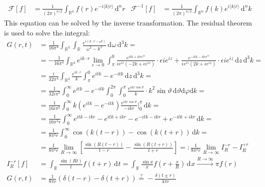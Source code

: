 \documentclass[a4paper,12pt]{article}
\newcommand{\brak}{}
\newcommand{\intx}{}
\newcommand{\intr}{}
\newcommand{\kla}{}
\newcommand{\klam}{}
\newcommand{\tecxt}{}
\begin{document}
\begin{align*}
\mathcal{F}\klam\left[ {f} \right]&=\frac{1}{(2\pi)^{n/2}}\intr\int_{\mathbb{R}^{n}}{f(r)e^{-i\brak\langle {k}| {r}\rangle}}\,\tecxt\text{d}^nr&\mathcal{F}^{-1}\klam\left[ {f} \right]&=\frac{1}{(2\pi)^{n/2}}\intr\int_{\mathbb{R}^{n}}{f(k)e^{i\brak\langle {k}| {r}\rangle}}\,\mathrm{d}^{n}k
\end{align*} 
This equation can be solved by the inverse transformation. The residual theorem is used to solve the integral:
\begin{align*}
G(r,t)&=\frac{1}{16\pi^4}\intr\int_{\mathbb{R}^{3}}{\intr\int_{\mathbb{R}^{ }}{\frac{e^{i\kla\left( {k\cdot r-\omega t} \right)}}{\omega^2-k^2}}\,\mathrm{d}^{ }\omega}\,\mathrm{d}^{3}k= \\
&=-\frac{1}{16\pi^4}\intr\int_{\mathbb{R}^{3}}e^{ik\cdot r}\lim_{\epsilon\rightarrow 0}{\intx\int_{\pi}^{0}\frac{e^{itk+it\epsilon  e^{iz}}}{\epsilon e^{iz}\kla\left( {-2k+\epsilon e^{iz}} \right)}\cdot\epsilon ie^{iz}+\frac{e^{-itk-it\epsilon e^{iz}}}{\epsilon e^{iz}\kla\left( {2k+\epsilon e^{iz}} \right)}\cdot\epsilon ie^{iz}\,\mathrm{d}z}\,\mathrm{d}^{3}k=\\
&=\frac{i}{32\pi^4}\intr\int_{\mathbb{R}^{3}}{\frac{e^{ik\cdot r}}{k}\intx\int_{\pi}^{0}e^{itk}-e^{-itk}\,\mathrm{d}z}\,\mathrm{d}^{3}k=\\
&=\frac{1}{32i\pi^3}\intx\int_{0}^{\infty}e^{itk}-e^{-itk}\intx\int_{0}^{2\pi}\intx\int_{0}^{\pi}\frac{e^{ikr\cos\vartheta}}{k}\cdot k^2\sin\vartheta\,\mathrm{d}\vartheta\mathrm{d}\varphi\mathrm{d}k=\\
&=\frac{1}{16i\pi^2}\intx\int_{0}^{\infty}k\kla\left( {e^{itk}-e^{-itk}} \right)\frac{e^{ikr\cos\vartheta}}{-ikr}\bigg\vert_{0}^\pi\,\mathrm{d}k=\\
&=\frac{1}{16\pi^2r}\intx\int_{0}^{\infty}e^{itk-ikr}-e^{itk+ikr}-e^{-itk-ikr}+e^{-itk+ikr}\,\mathrm{d}k=\\
&=\frac{1}{8\pi^2r}\intx\int_{0}^{\infty}\cos\kla\left( {k(t-r)} \right)-\cos\kla\left( {k(t+r)} \right)\,\mathrm{d}k= \\
&=\frac{1}{8\pi^2r}\lim_{R\rightarrow\infty}\klam\left[ {\frac{\sin\kla\left( {R(t-r)} \right)}{t-r}-\frac{\sin\kla\left( {R(t+r)} \right)}{t+r}} \right]=:\frac{1}{8\pi^2r}\lim_{R\rightarrow\infty}I_R^{-r}-I_R^{+r}\\
I_R^{-r}\klam\left[ {f} \right]&=\intr\int_{\mathbb{R}^{ }}{\frac{\sin\kla\left( {Rt} \right)}{t}f(t+r)}\,\mathrm{d}^{ }t=\intr\int_{\mathbb{R}^{ }}{\frac{\sin x}{x}}f\kla\left( {r+\frac{x}{R}} \right)\,\mathrm{d}^{ }x\overset{R\rightarrow\infty}{\longrightarrow}\pi f(r)\\
G(r,t)&=\frac{1}{8\pi r}\kla\left( {\delta(t-r)-\delta(t+r)} \right)\overset{?}{=}-\frac{\delta (t\pm r)}{4\pi r}
\end{align*}
\end{document}
